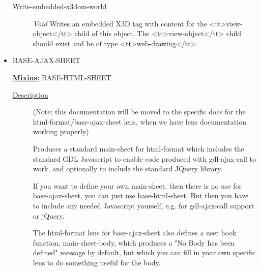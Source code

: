 \documentclass [11pt]{book}
\begin{document}
\begin{itemize}
\begin{description}

\item [Write-embedded-x3dom-world]
\emph{Void} Writes an embedded X3D tag with content for the <tt>view-object</tt> child of this object.
The <tt>view-object</tt> child should exist and be of type <tt>web-drawing</tt>.


\end{description}







\item {}BASE-AJAX-SHEET


\textbf{
\underline{Mixins:}} BASE-HTML-SHEET





\begin{description}

\item [
\underline{Description}]


(Note: this documentation will be moved
to the specific docs for the html-format/base-ajax-sheet lens, when 
we have lens documentation working properly)

Produces a standard main-sheet for html-format which includes the
standard GDL Javascript to enable code produced with gdl-ajax-call to
work, and optionally to include the standard JQuery library.

If you want to define your own main-sheet, then there is no use for
base-ajax-sheet, you can just use base-html-sheet. But then you have
to include any needed Javascript yourself, e.g. for gdl-ajax-call
support or jQuery.

The html-format lens for base-ajax-sheet also defines a user hook function,
main-sheet-body, which produces a "No Body has been defined" message by default, 
but which you can fill in your own specific lens to do something useful for the body.



\end{description}




\begin{figure}
\begin{lrbox}{\boxedverb}
\begin{minipage}{\linewidth}
{\small

}
\end{minipage}
\end{lrbox}
\end{figure}
\end{itemize}
\end{document}
